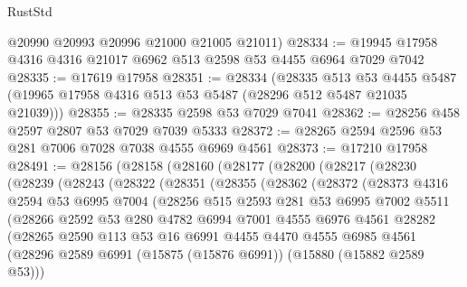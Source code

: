 \begin{lexlean}{RustStd}
\begin{coremodule}
      @20990
      @20993
      @20996
      @21000
      @21005
      @21011)
@28334 := @19945 @17958 @4316 @4316 @21017 @6962 @513 @2598 @53 @4455 @6964 @7029 @7042
@28335 := @17619 @17958
@28351 := @28334
    (@28335
      @513
      @53
      @4455
      @5487
      (@19965 @17958 @4316 @513 @53 @5487 (@28296 @512 @5487 @21035 @21039)))
@28355 := @28335 @2598 @53 @7029 @7041
@28362 := @28256 @458 @2597 @2807 @53 @7029 @7039 @5333
@28372 := @28265 @2594 @2596 @53 @281 @7006 @7028 @7038 @4555 @6969 @4561
@28373 := @17210 @17958
@28491 := @28156
    (@28158
      (@28160
        (@28177
          (@28200
            (@28217
              (@28230
                (@28239
                  (@28243
                    (@28322
                      (@28351
                        (@28355
                          (@28362
                            (@28372
                              (@28373
                                @4316
                                @2594
                                @53
                                @6995
                                @7004
                                (@28256
                                  @515
                                  @2593
                                  @281
                                  @53
                                  @6995
                                  @7002
                                  @5511
                                  (@28266
                                    @2592
                                    @53
                                    @280
                                    @4782
                                    @6994
                                    @7001
                                    @4555
                                    @6976
                                    @4561
                                    @28282
                                    (@28265
                                      @2590
                                      @113
                                      @53
                                      @16
                                      @6991
                                      @4455
                                      @4470
                                      @4555
                                      @6985
                                      @4561
                                      (@28296
                                        @2589
                                        @6991
                                        (@15875 (@15876 @6991))
                                        (@15880 (@15882 @2589 @53)))

\end{coremodule}
\end{lexlean}
